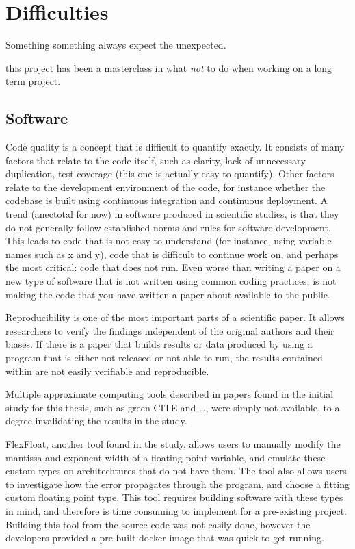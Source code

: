 \section*{Difficulties}

Something something always expect the unexpected.

this project has been a masterclass in what \textit{not} to do when working on a long term project.

\subsection*{Software}
Code quality is a concept that is difficult to quantify exactly.
It consists of many factors that relate to the code itself, such as clarity, lack of unnecessary duplication,
test coverage (this one is actually easy to quantify).
Other factors relate to the development environment of the code, for instance whether the codebase is built using
continuous integration and continuous deployment.
A trend (anectotal for now) in software produced in scientific studies, is that they do not generally follow established norms and rules for software development.
This leads to code that is not easy to understand (for instance, using
variable names such as x and y), code that is difficult to continue work on, and perhaps the most critical: code that
does not run.
Even worse than writing a paper on a new type of software that is not written using common coding practices, is not making the code that you have written a paper about available to the public.

Reproducibility is one of the most important parts of a scientific paper.
It allows researchers to verify the findings independent of the original authors and their biases.
If there is a paper that builds results or data produced by using a program that is either not released or not able to run, the results contained within are not easily verifiable and reproducible.

Multiple approximate computing tools described in papers found in the initial study for this thesis, such as green CITE and \ldots, were simply not available, to a degree invalidating the results in the study.

FlexFloat, another tool found in the study, allows users to manually modify the mantissa and exponent width of a floating point variable, and emulate these custom types on architechtures that do not have them. The tool also allows users to investigate how the error propagates through the program, and choose a fitting custom floating point type. This tool requires building software with these types in mind, and therefore is time consuming to implement for a pre-existing project. Building this tool from the source code was not easily done, however the developers provided a pre-built docker image that was quick to get running.


